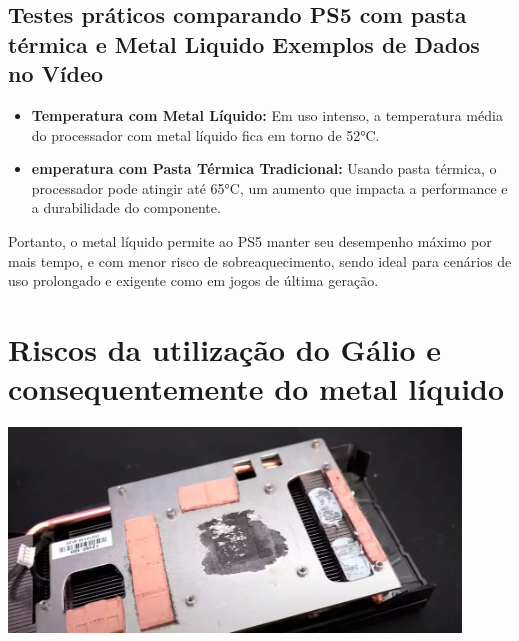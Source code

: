 \documentclass{article}
\begin{document}
\subsection{Testes práticos comparando PS5 com pasta térmica e Metal Liquido
Exemplos de Dados no Vídeo}
\begin{itemize}
    \item \textbf{Temperatura com Metal Líquido: } Em uso intenso, a temperatura média do processador com metal líquido fica em torno de 52°C.
    \item \textbf{emperatura com Pasta Térmica Tradicional: } Usando pasta térmica, o processador pode atingir até 65°C, um aumento que impacta a performance e a durabilidade do componente.
\end{itemize}
Portanto, o metal líquido permite ao PS5 manter seu desempenho máximo por mais tempo, e com menor risco de sobreaquecimento, sendo ideal para cenários de uso prolongado e exigente como em jogos de última geração.
\section{Riscos da utilização do Gálio e consequentemente do metal líquido}
\begin{adjustbox}{center,caption={},nofloat=figure,vspace=\bigskipamount}
    \centering
    \includegraphics[width=12cm]{heatspreader.png}
\end{adjustbox}
\end{document}
